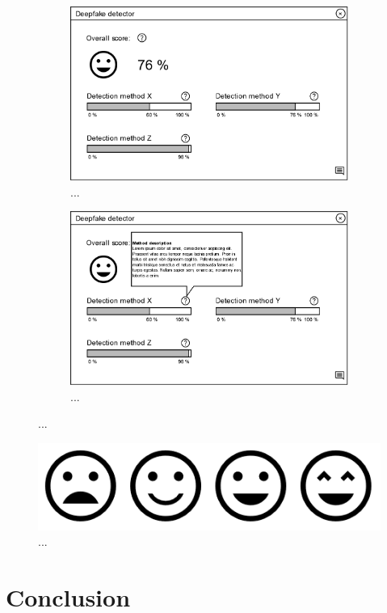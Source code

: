 \begin{figure}[H]
    \begin{subfigure}[h]{.475\linewidth}
        \centering
        \includegraphics[width=1\linewidth]{other-fig/client_wireframe_results.png}
        \caption{...}
    \end{subfigure}
    \hfill
    \begin{subfigure}[h]{.475\linewidth}
        \centering
        \includegraphics[width=1\linewidth]{other-fig/client_wireframe_results2.png}
        \caption{...}
    \end{subfigure}
    \caption{...}
    \label{fig:xxx}
\end{figure}

\begin{figure}[H]
    \centering
    \includegraphics[width=.4\linewidth]{other-fig/client_wireframe_results3.png}        
    \caption{...}
\label{fig:xxx}
\end{figure}




\chapter{Conclusion}